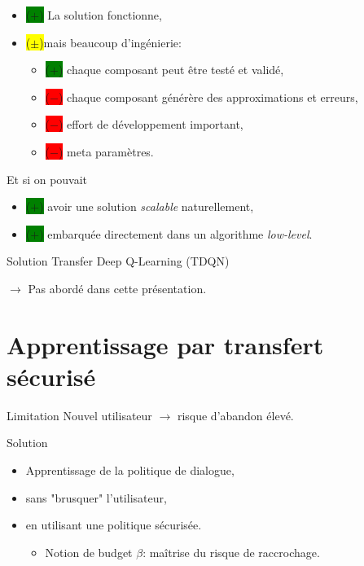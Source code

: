 \documentclass[french]{beamer}
\newcommand{\cplus}{\colorbox{green}{($+$)} }
\newcommand{\cmoins}{\colorbox{red}{($-$)} }
\newcommand{\cmean}{\colorbox{yellow}{($\pm$)}}
\begin{document}
    \begin{frame}
        \begin{itemize}
            \item \cplus La solution fonctionne,
            \item \cmean mais beaucoup d'ingénierie:
            \begin{itemize}
                \item \cplus chaque composant peut être testé et validé,
                \item \cmoins chaque composant générère des approximations et erreurs,
                \item \cmoins effort de développement important,
                \item \cmoins meta paramètres.
            \end{itemize}
        \end{itemize}
        \pause
        Et si on pouvait
        \begin{itemize}
            \item \cplus avoir une solution \textit{scalable} naturellement,
            \item \cplus embarquée directement dans un algorithme \textit{low-level}.
        \end{itemize}
        \begin{exampleblock}{Solution}
            Transfer Deep Q-Learning (TDQN)
        \end{exampleblock}
        $\rightarrow$ Pas abordé dans cette présentation.
    \end{frame}



    \section{Apprentissage par transfert sécurisé}


    \begin{frame}

        \begin{alertblock}{Limitation}
            Nouvel utilisateur $\rightarrow$ risque d'abandon élevé.
        \end{alertblock}


        \begin{exampleblock}{Solution}
            \begin{itemize}
                \item Apprentissage de la politique de dialogue,
                \item sans "brusquer" l'utilisateur,
                \item en utilisant une politique sécurisée.
                \begin{itemize}
                    \item Notion de budget $\beta$: maîtrise du risque de raccrochage.
                \end{itemize}
            \end{itemize}
        \end{exampleblock}

    \end{frame}
\end{document}
